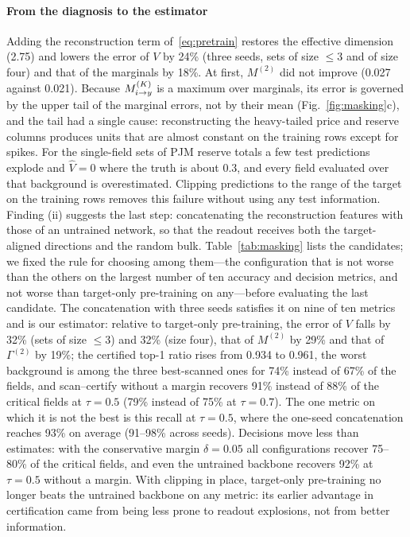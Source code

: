 \paragraph{From the diagnosis to the estimator}
Adding the reconstruction term of~\eqref{eq:pretrain} restores the effective dimension (2.75) and lowers the error of
$V$ by 24\% (three seeds, sets of size $\le3$ and of size four) and that of the marginals by 18\%. At first, $M^{(2)}$ did
not improve (0.027 against 0.021). Because $M^{(K)}_{i \to y}$ is a maximum over marginals, its error is governed by the upper tail of
the marginal errors, not by their mean (Fig.~\ref{fig:masking}c), and the tail had a single cause: reconstructing the
heavy-tailed price and reserve columns produces units that are almost constant on the training rows except for spikes.
For the single-field sets of PJM reserve totals a few test predictions explode and $\hat V=0$ where the truth is about
0.3, and every field evaluated over that background is overestimated. Clipping predictions to the range of the target
on the training rows removes this failure without using any test information. Finding (ii) suggests the last step:
concatenating the reconstruction features with those of an untrained network, so that the readout receives both the
target-aligned directions and the random bulk. Table~\ref{tab:masking} lists the candidates; we fixed the rule for choosing
among them---the configuration that is not worse than the others on the largest number of ten accuracy and decision
metrics, and not worse than target-only pre-training on any---before evaluating the last candidate. The concatenation with
three seeds satisfies it on nine of ten metrics and is our estimator: relative to target-only pre-training, the error of
$V$ falls by 32\% (sets of size $\le3$) and 32\% (size four), that of $M^{(2)}$ by 29\% and that of $\Gamma^{(2)}$ by 19\%;
the certified top-1 ratio rises from 0.934 to 0.961, the worst background is among the three best-scanned ones for 74\%
instead of 67\% of the fields, and scan--certify without a margin recovers 91\% instead of 88\% of the critical fields at
$\tau=0.5$ (79\% instead of 75\% at $\tau=0.7$). The one metric on which it is not the best is this recall at $\tau=0.5$,
where the one-seed concatenation reaches 93\% on average (91--98\% across seeds). Decisions move less than estimates:
with the conservative margin $\delta=0.05$ all configurations recover 75--80\% of the critical fields, and even the
untrained backbone recovers 92\% at $\tau=0.5$ without a margin. With clipping in place, target-only pre-training no longer
beats the untrained backbone on any metric: its earlier advantage in certification came from being less prone to readout
explosions, not from better information.

